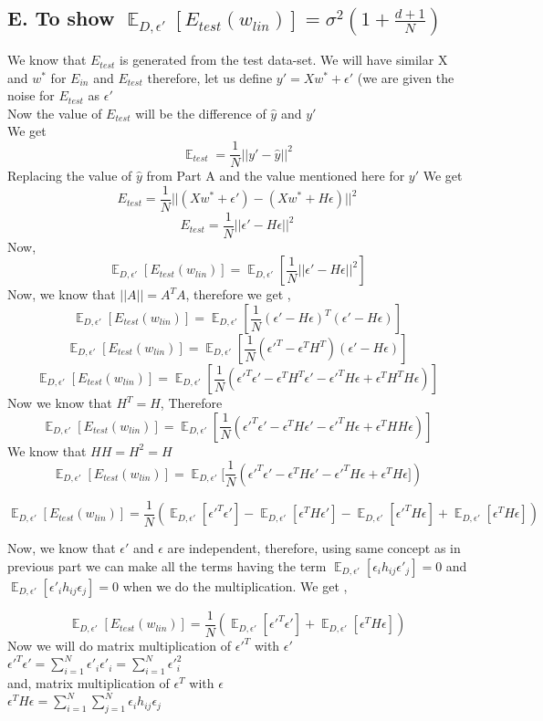\documentclass{article}
\DeclareMathOperator{\E}{\mathbb{E}}
\begin{document}
\subsection{E. To show $\E_{D,\epsilon'}[E_{test}(w_{lin})]=\sigma^2(1+\frac{d+1}{N})$}
We know that $E_{test}$ is generated from the test data-set. We will have similar X and $w^*$ for $E_{in}$ and $E_{test}$ therefore, let us define $y' = Xw^*+\epsilon'$ (we are given the noise for $E_{test} $ as $\epsilon'$\\
Now the value of $E_{test}$ will be the difference of $\hat{y}$ and $y'$\\
We get 
$$\E_{test}= \frac{1}{N}||y'-\hat{y}||^2 $$
Replacing the value of $\hat{y}$ from Part A and the value mentioned here for $y'$
We get 
$$E_{test} = \frac{1}{N}||(Xw^*+\epsilon')-(Xw^* + H\epsilon )||^2$$
$$E_{test} =  \frac{1}{N}||\epsilon'-H\epsilon||^2$$
Now,
$$\E_{D,\epsilon'}[E_{test}(w_{lin})]=\E_{D,\epsilon'}[ \frac{1}{N}||\epsilon'-H\epsilon||^2]$$
Now, we know that $||A|| = A^TA$, therefore we get , 
$$\E_{D,\epsilon'}[E_{test}(w_{lin})]=\E_{D,\epsilon'}[ \frac{1}{N}(\epsilon'-H\epsilon)^T(\epsilon'-H\epsilon)]$$
$$\E_{D,\epsilon'}[E_{test}(w_{lin})]=\E_{D,\epsilon'}[ \frac{1}{N}(\epsilon'^T-\epsilon^TH^T)(\epsilon'-H\epsilon)]$$
$$\E_{D,\epsilon'}[E_{test}(w_{lin})]=\E_{D,\epsilon'}[ \frac{1}{N}(\epsilon'^T\epsilon'-\epsilon^TH^T\epsilon'-\epsilon'^TH\epsilon + \epsilon^TH^TH\epsilon )]$$
Now we know that $H^T = H$, Therefore
$$\E_{D,\epsilon'}[E_{test}(w_{lin})]=\E_{D,\epsilon'}[ \frac{1}{N}(\epsilon'^T\epsilon'-\epsilon^TH\epsilon'-\epsilon'^TH\epsilon + \epsilon^THH\epsilon )]$$
We know that $HH=H^2=H$
$$\E_{D,\epsilon'}[E_{test}(w_{lin})]=\E_{D,\epsilon'}[ \frac{1}{N}(\epsilon'^T\epsilon'-\epsilon^TH\epsilon'-\epsilon'^TH\epsilon + \epsilon^TH\epsilon ])$$

$$\E_{D,\epsilon'}[E_{test}(w_{lin})]=\frac{1}{N}(\E_{D,\epsilon'}[ \epsilon'^T\epsilon']-\E_{D,\epsilon'}[ \epsilon^TH\epsilon']-\E_{D,\epsilon'}[ \epsilon'^TH\epsilon] + \E_{D,\epsilon'}[ \epsilon^TH\epsilon ])$$

Now, we know that $\epsilon'$ and $\epsilon$ are independent, therefore, using same concept as in previous part we can make all the terms having the term $\E_{D,\epsilon'}[\epsilon_ih_{ij}\epsilon'_j]= 0$  and $\E_{D,\epsilon'}[\epsilon'_ih_{ij}\epsilon_j]= 0$ when we do the multiplication. We get ,

$$\E_{D,\epsilon'}[E_{test}(w_{lin})]=\frac{1}{N}(\E_{D,\epsilon'}[ \epsilon'^T\epsilon']+\E_{D,\epsilon'}[ \epsilon^TH\epsilon ])$$
Now we will do matrix multiplication of $\epsilon'^T$ with $\epsilon'$\\
$\epsilon'^T\epsilon'=\sum_{i=1}^{N}\epsilon'_i\epsilon'_i = \sum_{i=1}^{N}\epsilon'_{i}^2$\\
and, matrix multiplication of $\epsilon^T$ with $\epsilon$\\
$\epsilon^TH\epsilon=\sum_{i=1}^{N}\sum_{j=1}^{N}\epsilon_ih_{ij}\epsilon_j$\\
\end{document}
